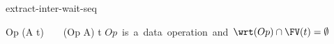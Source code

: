 \begin{circustimelaw}{extract-inter-wait-seq}
\begin{circusaction*}
  Op \circseq (A \interleave \circwait t) ~ \equiv ~ (Op \circseq A) \interleave \circwait t
  \also
  \provided \; \mbox{$Op$ is a data operation and $\wrt(Op) \cap \FV(t) = \emptyset$}
\end{circusaction*}
\end{circustimelaw}
